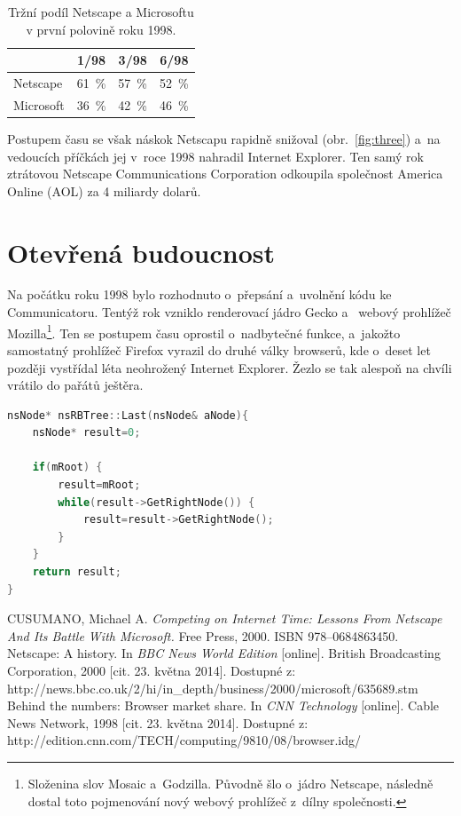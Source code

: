 \documentclass[a4paper, 11pt]{scrartcl}
\begin{document}
\begin{table}[ht]
\centering
\begin{tabular}{|l|c|c|c|}
\hline
 & 1/98 & 3/98 & 6/98 \\
\hline
Netscape & 61~\% & 57~\% & 52~\% \\
\hline
Microsoft & 36~\% & 42~\% & 46~\% \\
\hline
\end{tabular}
\caption{Tržní podíl Netscape a Microsoftu v první polovině roku 1998.\cite{cnn}}
\label{tab:one}
\end{table}

Postupem času se však náskok Netscapu rapidně snižoval (obr.~\ref{fig:three}) a~na vedoucích příčkách jej v~roce 1998 nahradil Internet Explorer. Ten samý rok ztrátovou Netscape Communications Corporation odkoupila společnost America Online (AOL) za 4 miliardy dolarů.

\newpage

\section{Otevřená budoucnost}
Na počátku roku 1998 bylo rozhodnuto o~přepsání a~uvolnění kódu ke Communicatoru. Tentýž rok vzniklo renderovací jádro Gecko a~ webový prohlížeč Mozilla\footnote{Složenina slov Mosaic a~Godzilla. Původně šlo o~jádro Netscape, následně dostal toto pojmenování nový webový prohlížeč z~dílny společnosti.}. Ten se postupem času oprostil o~nadbytečné funkce, a~jakožto samostatný prohlížeč Firefox vyrazil do druhé války browserů, kde o~deset let později vystřídal léta neohrožený Internet Explorer. Žezlo se tak alespoň na chvíli vrátilo do pařátů ještěra.

\begin{lstlisting}[language=C++,caption=Ukázka kódu Mozilly – výběr posledního uzlu v červeno–černé stromové struktuře.,captionpos=b]
nsNode* nsRBTree::Last(nsNode& aNode){
	nsNode* result=0;

	if(mRoot) {
		result=mRoot;
		while(result->GetRightNode()) {
			result=result->GetRightNode();
		}
	}
	return result;
}
\end{lstlisting}

\newpage

\begin{thebibliography}{}
CUSUMANO, Michael A. \textit{Competing on Internet Time: Lessons From Netscape And Its Battle With Microsoft.} Free Press, 2000. ISBN 978–0684863450.
Netscape: A history. In \textit{BBC News World Edition} [online]. British Broadcasting Corporation, 2000 [cit. 23. května 2014]. Dostupné z: http://news.bbc.co.uk/2/hi/in\_depth/business/2000/microsoft/635689.stm
Behind the numbers: Browser market share. In \textit{CNN Technology} [online]. Cable News Network, 1998 [cit. 23. května 2014]. Dostupné z: http://edition.cnn.com/TECH/computing/9810/08/browser.idg/
\end{thebibliography}
\end{document}
